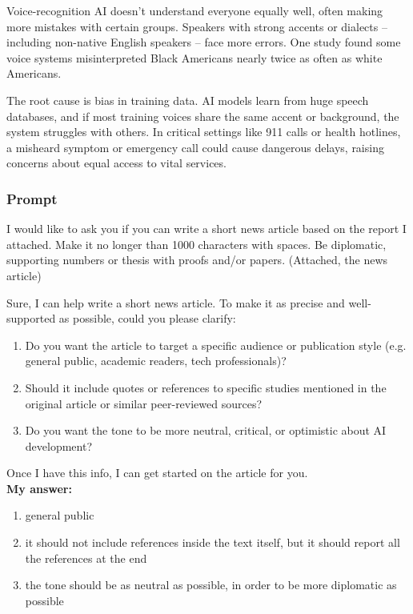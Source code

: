 \documentclass{article}
\begin{document}
Voice-recognition AI doesn’t understand everyone equally well, often making more mistakes with certain groups. Speakers with strong accents or dialects – including non-native English speakers – face more errors. One study found some voice systems misinterpreted Black Americans nearly twice as often as white Americans.

The root cause is bias in training data. AI models learn from huge speech databases, and if most training voices share the same accent or background, the system struggles with others. In critical settings like 911 calls or health hotlines, a misheard symptom or emergency call could cause dangerous delays, raising concerns about equal access to vital services.

\subsubsection*{Prompt}
I would like to ask you if you can write a short news article based on the report I attached.
Make it no longer than 1000 characters with spaces. Be diplomatic,
supporting numbers or thesis with proofs and/or papers. (Attached, the news article)

Sure, I can help write a short news article. To make it as precise and well-supported as possible, could you please clarify:

\begin{enumerate}
    \item Do you want the article to target a specific audience or publication style (e.g. general public, academic readers, tech professionals)?
    \item Should it include quotes or references to specific studies mentioned in the original article or similar peer-reviewed sources?
    \item Do you want the tone to be more neutral, critical, or optimistic about AI development?
\end{enumerate}

Once I have this info, I can get started on the article for you.
\\

\textbf{My answer:}
\begin{enumerate}
    \item general public
    \item it should not include references inside the text itself, but it should report all the references at the end
    \item the tone should be as neutral as possible, in order to be more diplomatic as possible
\end{enumerate}
\end{document}
